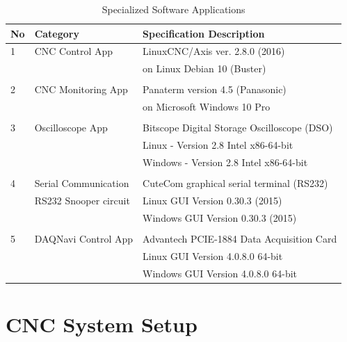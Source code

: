 \begin{table}[ht]
\caption{Specialized Software Applications}
\label{chap3-Specialized Software Applications}
	
\begin{tabular}{p{0.5cm} p{4.30cm} p{9.2cm} }
\hline	
\textbf{No} & \textbf{Category}   &    \textbf{Specification Description}\\
\hline
1 &	CNC Control App       & LinuxCNC/Axis ver. 2.8.0 (2016)\\ 
  &                       & on Linux Debian 10 (Buster)  \\
  &                       &    \\
2 &	CNC Monitoring  App   & Panaterm version 4.5 (Panasonic)\\
  &                       & on Microsoft Windows 10 Pro \\
  &                       & \\
3 & Oscilloscope App      & Bitscope Digital Storage Oscilloscope (DSO) \\
  &                       & Linux - Version 2.8 Intel x86-64-bit \\ 	
  &                       & Windows - Version 2.8 Intel x86-64-bit \\   
  &                       &   \\ 
4 & Serial Communication  & CuteCom graphical serial terminal (RS232) \\ 
  & RS232 Snooper circuit & Linux GUI Version  0.30.3 (2015) \\
  &                       & Windows GUI Version  0.30.3 (2015)\\
  &                       &     \\
5 & DAQNavi Control App   & Advantech PCIE-1884 Data Acquisition Card \\ 
  &                       & Linux GUI Version  4.0.8.0 64-bit \\
  &                       & Windows GUI Version  4.0.8.0 64-bit\\  
 \hline
\end{tabular}
\end{table}

\clearpage
\pagebreak
\section{CNC System Setup}


